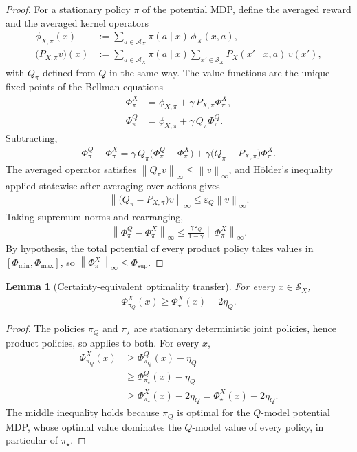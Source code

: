 \documentclass{article}
\theoremstyle{plain}
\newtheorem{lemma}[theorem]{Lemma}
\theoremstyle{definition}
\theoremstyle{remark}
\newcommand{\Ac}{\mathcal{A}}
\newcommand{\norm}[1]{\left\lVert#1\right\rVert}
\newcommand{\Phisup}{\Phi_{\mathrm{sup}}}
\begin{document}
\begin{proof}
For a stationary policy $\pi$ of the potential MDP, define the averaged
reward and the averaged kernel operators
\begin{align*}
  \phi_{X,\pi}(x)
  &:=
  \sum_{a\in\Ac_X}\pi(a\mid x)\,\phi_X(x,a),\\
  \big(P_{X,\pi}v\big)(x)
  &:=
  \sum_{a\in\Ac_X}\pi(a\mid x)
  \sum_{x'\in\mathcal S_X}
  P_X(x'\mid x,a)\,v(x'),
\end{align*}
with $Q_\pi$ defined from $Q$ in the same way. The value functions are the
unique fixed points of the Bellman equations
\begin{align*}
  \Phi^X_\pi
  &=
  \phi_{X,\pi}+\gamma\,P_{X,\pi}\Phi^X_\pi,\\
  \Phi^Q_\pi
  &=
  \phi_{X,\pi}+\gamma\,Q_\pi\Phi^Q_\pi.
\end{align*}
Subtracting,
\begin{align*}
  \Phi^Q_\pi-\Phi^X_\pi
  =
  \gamma\,Q_\pi
  \big(\Phi^Q_\pi-\Phi^X_\pi\big)
  +\gamma\big(Q_\pi-P_{X,\pi}\big)\Phi^X_\pi.
\end{align*}
The averaged operator satisfies
$\norm{Q_\pi v}_\infty\le\norm v_\infty$, and H\"older's inequality applied
statewise after averaging over actions gives
\begin{align*}
  \norm{\big(Q_\pi-P_{X,\pi}\big)v}_\infty
  \le
  \varepsilon_Q\norm v_\infty.
\end{align*}
Taking supremum norms and rearranging,
\begin{align*}
  \norm{\Phi^Q_\pi-\Phi^X_\pi}_\infty
  \le
  \frac{\gamma\,\varepsilon_Q}{1-\gamma}
  \norm{\Phi^X_\pi}_\infty.
\end{align*}
By hypothesis, the total potential of every product policy takes values in
$[\Phi_{\min},\Phi_{\max}]$, so
$\norm{\Phi^X_\pi}_\infty\le\Phisup$.
\end{proof}

\begin{lemma}[Certainty-equivalent optimality transfer]
\label{lemma:ce-optimality}
For every $x\in\mathcal S_X$,
\begin{align*}
  \Phi^X_{\pi_Q}(x)
  \ge
  \Phi^X_\star(x)-2\eta_Q.
\end{align*}
\end{lemma}

\begin{proof}
The policies $\pi_Q$ and $\pi_\star$ are stationary deterministic joint
policies, hence product policies, so 
applies to both. For every $x$,
\begin{align*}
  \Phi^X_{\pi_Q}(x)
  &\ge
  \Phi^Q_{\pi_Q}(x)-\eta_Q\\
  &\ge
  \Phi^Q_{\pi_\star}(x)-\eta_Q\\
  &\ge
  \Phi^X_{\pi_\star}(x)-2\eta_Q
  =
  \Phi^X_\star(x)-2\eta_Q.
\end{align*}
The middle inequality holds because $\pi_Q$ is optimal for the $Q$-model
potential MDP, whose optimal value dominates the $Q$-model value of every
policy, in particular of $\pi_\star$.
\end{proof}
\end{document}
